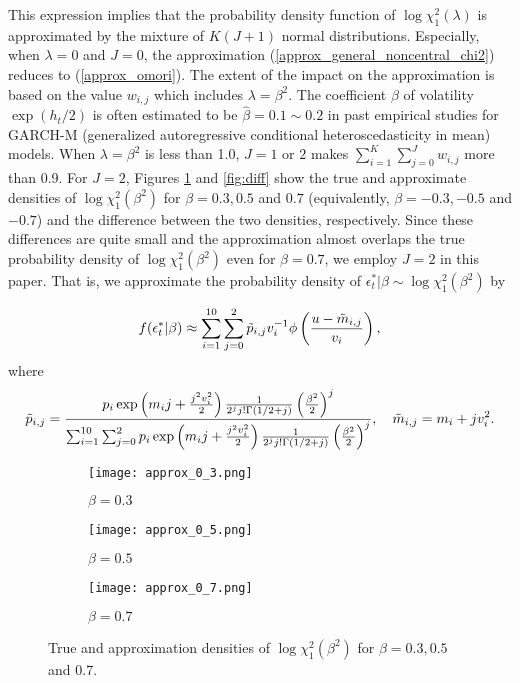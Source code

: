 This expression implies that the probability density function of $\log \chi_1^2(\lambda)$ is approximated by the mixture of $K(J+1)$ normal distributions.
Especially, when $\lambda = 0$ and $J=0$, the approximation (\ref{approx_general_noncentral_chi2}) reduces to (\ref{approx_omori}). 
The extent of the impact on the approximation is based on the value $w_{i,j}$ which includes $\lambda=\beta^2$.
The coefficient $\beta$ of volatility $\exp(h_t/2)$ is often estimated to be $\hat{\beta} = 0.1 \sim 0.2$ in past empirical studies for GARCH-M (generalized autoregressive conditional heteroscedasticity in mean) models.
When $\lambda = \beta^2$ is less than 1.0, $J = 1$ or $2$ makes $\sum_{i=1}^{K} \sum_{j=0}^{J} w_{i,j}$ more than 0.9.
For $J=2$, Figures \ref{fig:approx} and \ref{fig:diff} show the true and approximate densities of $\log \chi_1^2(\beta^2)$ for $\beta = 0.3, 0.5$ and $0.7$ (equivalently, $\beta = -0.3, -0.5$ and $-0.7$) and the difference between the two densities, respectively.
Since these differences are quite small and the approximation  almost overlaps the true probability density of $\log \chi_1^2(\beta^2)$ even for $\beta=0.7$, we employ $J = 2$ in this paper. That is, we approximate the probability density of $\epsilon_t^*|\beta \sim \log \chi_1^2(\beta^2)$ by

\begin{equation}
    f(\epsilon_t^*|\beta) \approx \sum_{i=1}^{10} \sum_{j=0}^{2} \Tilde{p}_{i,j} v_i^{-1} \phi \left( \frac{u-\Tilde{m}_{i,j}}{v_i} \right),
    \label{approx_noncentral_chi2}
\end{equation}
where
\begin{equation*}
    \Tilde{p}_{i,j} = \frac{p_i \exp \left( m_i j + \frac{j^2 v_i^2}{2} \right) \frac{1}{2^j j! \Gamma(1/2 + j)} \left(\frac{\beta^2}{2}\right)^j}{\sum_{i=1}^{10} \sum_{j=0}^{2} p_i \exp \left( m_i j + \frac{j^2 v_i^2}{2} \right) \frac{1}{2^j j! \Gamma(1/2 + j)} \left(\frac{\beta^2}{2}\right)^j}, \quad \Tilde{m}_{i,j} = m_i+j v_i^2.
\end{equation*}

\begin{figure}[H]
    \centering
    \begin{subfigure}{0.325\linewidth}
        \centering
        \texttt{[image: approx\_0\_3.png]}
        \caption{$\beta = 0.3$}
    \end{subfigure}
    \hfill
    \begin{subfigure}{0.325\linewidth}
        \centering
        \texttt{[image: approx\_0\_5.png]}
        \caption{$\beta = 0.5$}
    \end{subfigure}
    \hfill
    \begin{subfigure}{0.325\linewidth}
        \centering
        \texttt{[image: approx\_0\_7.png]}
        \caption{$\beta = 0.7$}
    \end{subfigure}
    \caption{True and approximation densities of $\log \chi_1^2(\beta^2)$ for $\beta = 0.3,0.5$ and $0.7$.}
    \label{fig:approx}
\end{figure}


